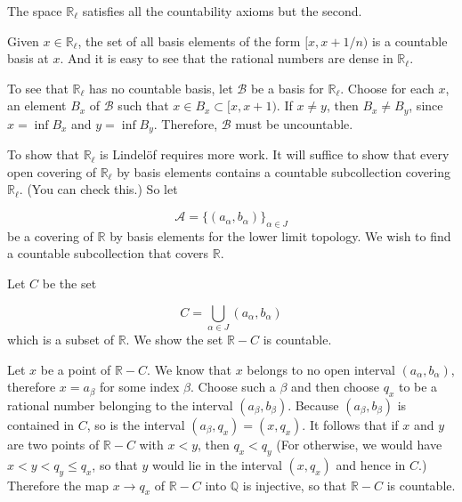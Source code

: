 \begin{centeredblock*}
\begin{example}
\label{ex:\thesection.\theexample}
 The space \(\mathbb{R}_{\ell }\) satisfies all the countability axioms but the second.

Given \(x \in {\mathbb{R}}_{\ell }\), the set of all basis elements of the form \(\lbrack x,x + 1/n)\) is a countable basis at \(x\). And it is easy to see that the rational numbers are dense in \(\mathbb{R}_{\ell }\).

To see that \(\mathbb{R}_{\ell }\) has no countable basis, let \(\mathcal{B}\) be a basis for \(\mathbb{R}_{\ell }\). Choose for each \(x\), an element \(B_{x}\) of \(\mathcal{B}\) such that \(x \in {B}_{x} \subset \lbrack x,x + 1)\). If \(x \neq y\), then \(B_{x} \neq {B}_{y}\), since \(x = \inf {B}_{x}\) and \(y = \inf {B}_{y}\). Therefore, \(\mathcal{B}\) must be uncountable.

To show that \(\mathbb{R}_{\ell }\) is Lindelöf requires more work. It will suffice to show that every open covering of \(\mathbb{R}_{\ell }\) by basis elements contains a countable subcollection covering \(\mathbb{R}_{\ell }\). (You can check this.) So let

\[
\mathcal{A} = {\{ ( a_{\alpha },b_{\alpha }) \} }_{\alpha \in J}
\]
be a covering of \(\mathbb{R}\) by basis elements for the lower limit topology. We wish to find a countable subcollection that covers \(\mathbb{R}\).

Let \(C\) be the set

\[
C = \mathop{\bigcup }\limits_{{\alpha \in J}}( {a_{\alpha },b_{\alpha }})
\]
which is a subset of \(\mathbb{R}\). We show the set \(\mathbb{R} - C\) is countable.

Let \(x\) be a point of \(\mathbb{R} - C\). We know that \(x\) belongs to no open interval \(( {a_{\alpha },b_{\alpha }})\), therefore \(x = a_{\beta }\) for some index \(\beta\). Choose such a \(\beta\) and then choose \(q_{x}\) to be a rational number belonging to the interval \(( {a_{\beta },b_{\beta }})\). Because \(( {a_{\beta },b_{\beta }})\) is contained in \(C\), so is the interval \(( {a_{\beta },q_{x}}) = ( {x,q_{x}})\). It follows that if \(x\) and \(y\) are two points of \(\mathbb{R} - C\) with \(x < y\), then \(q_{x} < q_{y}\) (For otherwise, we would have \(x < y < q_{y} \leq {q}_{x}\), so that \(y\) would lie in the interval \(( {x,q_{x}})\) and hence in \(C\).) Therefore the map \(x \rightarrow {q}_{x}\) of \(\mathbb{R} - C\) into \(\mathbb{Q}\) is injective, so that \(\mathbb{R} - C\) is countable.


\end{example}
\end{centeredblock*}
